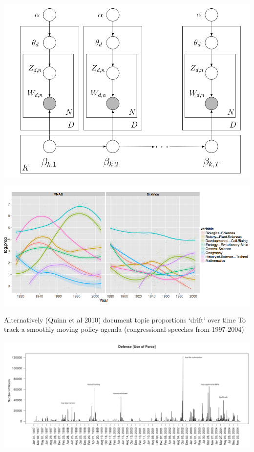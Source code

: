 \documentclass{mediumfoils}
\begin{document}
\centerline{\includegraphics[scale=.8]{pictures/blei-dynamic}}


\centerline{\includegraphics[scale=.7]{pictures/dynamics}}


Alternatively (Quinn et al 2010) document topic proportions `drift' over time 
\ita
\itm To track a smoothly moving policy agenda (congressional speeches from 1997-2004)
\itz

\centerline{\includegraphics[scale=.5]{pictures/defence-topic-quinn}}
\end{document}
